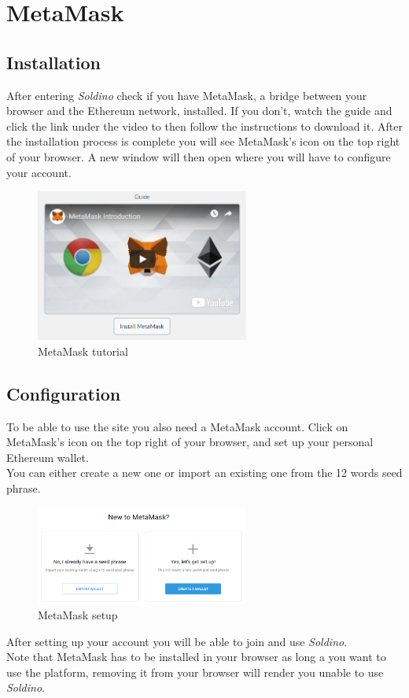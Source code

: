 \section{MetaMask}
	\subsection{Installation}
	After entering \textit{Soldino} check if you have MetaMask, a bridge between 
	your browser and the Ethereum network, installed.
	If you don't, watch the guide and click the link under the video to then 
	follow the instructions to download it. After the installation process is 
	complete you will see MetaMask's icon on the top right of your browser. A 
	new window will then open where you will have to configure your account.
	\newline
	\begin{figure}[H]
		\includegraphics[width=7cm]{res/images/MetaMask_download.png}
		\centering
		\caption{MetaMask tutorial}
	\end{figure}
	\subsection{Configuration}
	To be able to use the site you also need a MetaMask account. Click on 
	MetaMask's icon on the top right of your browser, and set up your 
	personal Ethereum wallet.\\
	You can either create a new one or import an existing one from the 12 
	words seed phrase.
	\begin{figure}[H]
		\includegraphics[width=7cm]{res/images/metamask_select.png}
		\centering
		\caption{MetaMask setup}
	\end{figure}
	\noindent After setting up your account you will be able to join and use 
	\textit{Soldino}.
	\newline \\
	Note that MetaMask has to be installed in your browser as long a you want 
	to use the platform, removing it from your browser will render you unable to
	use \textit{Soldino}.
